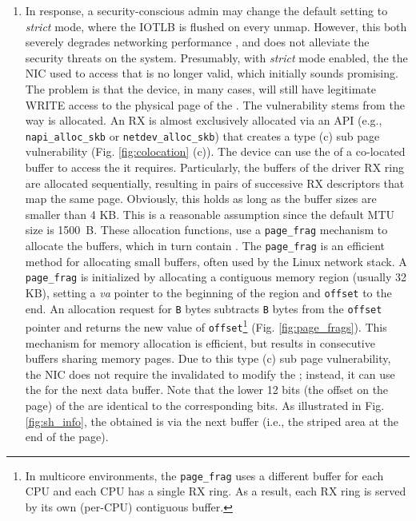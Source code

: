 \begin{enumerate}[label=(\alph*)]
\item In response, a security-conscious admin may change the default setting to \emph{strict} mode, where the IOTLB is flushed on every unmap. However, this both severely degrades networking performance \cite{MMT16,MSMT18}, and does not alleviate the security threats on the system. Presumably, with \emph{strict} mode enabled, the \iova{} the NIC used to access that \shinfo{} is no longer valid, which initially sounds promising. The problem is that the device, in many cases, will still have legitimate WRITE access to the physical page of the \shinfo. The vulnerability stems from the way \data{} is allocated. An RX \skb{} is almost exclusively allocated via an API (e.g., \texttt{napi\_alloc\_skb} or \texttt{netdev\_alloc\_skb}) that creates a type (c) sub page vulnerability (Fig. \ref{fig:colocation} (c)). The device can use the \iova{} of a co-located buffer to access the \shinfo{} it requires. Particularly, the buffers of the driver RX ring are allocated sequentially, resulting in pairs of successive RX descriptors that map the same page. Obviously, this holds as long as the buffer sizes are smaller than 4 KB. This is a reasonable assumption since the default MTU size is 1500~B. These allocation functions, use a \texttt{page\_frag} mechanism to allocate the \data{} buffers, which in turn contain \shinfo. The \texttt{page\_frag} is an efficient method for allocating small buffers, often used by the Linux network stack. A \texttt{page\_frag} is initialized by allocating a contiguous memory region (usually 32 KB), setting a \textit{va} pointer to the beginning of the region and \texttt{offset} to the end. An allocation request for \texttt{B} bytes subtracts \texttt{B} bytes from the \texttt{offset} pointer and returns the new value of \texttt{offset}\footnote{In multicore environments, the \texttt{page\_frag} uses a different buffer for each CPU and each CPU has a single RX ring. As a result, each RX ring is served by its own (per-CPU) contiguous buffer.} (Fig. \ref{fig:page_frags}). This mechanism for memory allocation is efficient, but results in consecutive \data{} buffers sharing memory pages. Due to this type (c) sub page vulnerability, the NIC does not require the invalidated \iova{} to modify the \shinfo; instead, it can use the \iova{} for the next data buffer. Note that the lower 12 bits (the offset on the page) of the \iova{} are identical to the corresponding \kva{} bits. As illustrated in Fig. \ref{fig:sh_info}, the \oportunity{} obtained is via the next buffer (i.e., the striped area at the end of the page).
\end{enumerate}

